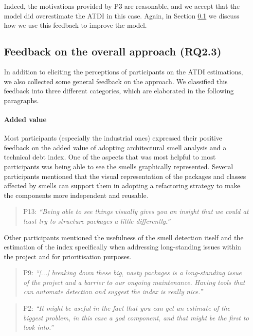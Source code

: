 Indeed, the motivations provided by P3 are reasonable, and we accept that the model did overestimate the ATDI in this case. Again, in Section \ref{c6:sec:general-feedback} we discuss how we use this feedback to improve the model.

\subsection{Feedback on the overall approach (RQ2.3)}\label{c6:sec:general-feedback}
In addition to eliciting the perceptions of participants on the ATDI estimations, we also collected some general feedback on the approach. We classified this feedback into three different categories, which are elaborated in the following paragraphs.

\paragraph{Added value}
Most participants (especially the industrial ones) expressed their positive feedback on the added value of adopting architectural smell analysis and a technical debt index.
One of the aspects that was most helpful to most participants was being able to see the smells graphically represented. 
Several participants mentioned that the visual representation of the packages and classes affected by smells can support them in adopting a refactoring strategy to make the components more independent and reusable.
\begin{quote}
    P13: \emph{``Being able to see things visually gives you an insight that we could at least try to structure packages a little differently.''}
\end{quote}

Other participants mentioned the usefulness of the smell detection itself and the estimation of the index specifically when addressing long-standing issues within the project and for prioritisation purposes.

\begin{quote}
    P9: \emph{``[...] breaking down these big, nasty packages is a long-standing issue of the project and a barrier to our ongoing maintenance. Having tools that can automate detection and suggest the index is really nice.''}    
\end{quote}

\begin{quote}
    P2: \emph{``It might be useful in the fact that you can get an estimate of the biggest problem, in this case a god component, and that might be the first to look into.''}
\end{quote}

